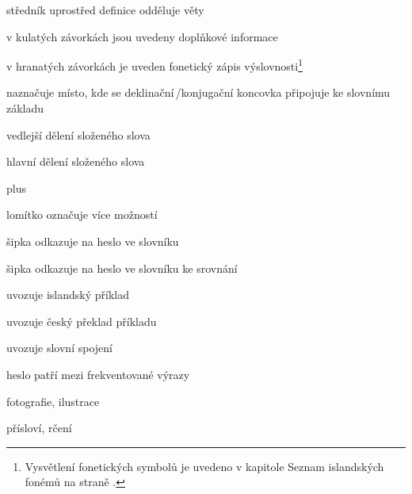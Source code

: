 \item[{;}] {středník uprostřed definice odděluje věty}

\item[{(...)}] {v kulatých závorkách jsou uvedeny doplňkové informace}
\item[{[...]}] {v hranatých závorkách je uveden fonetický zápis výslovnosti}\footnote{Vysvětlení fonetických symbolů je uvedeno v kapitole Seznam islandských fonémů na straně \pageref{sec:phon_phonems}.}
\item[{|}] {naznačuje místo, kde se deklinační\,/\addthin konjugační koncovka připojuje ke slovnímu základu}
\item[{·}] {vedlejší dělení složeného slova}
\item[{··}] {hlavní dělení složeného slova}
\item[{+}] {plus}
\item[{/}] {lomítko označuje více možností}
\item[{\dicsymSee}] {šipka odkazuje na heslo ve slovníku}
\item[{\dicsymCompare}] {šipka odkazuje na heslo ve slovníku ke srovnání}
\item[{\dicsymExampleIS}] {uvozuje islandský příklad}
\item[{\dicsymExampleCS}] {uvozuje český překlad příkladu}
\item[{\dicsymIdiom}] {uvozuje slovní spojení}
\item[{\dicsymFrequent}] {heslo patří mezi frekventované výrazy}

\item[{\dicsymPhoto}] {fotografie, ilustrace}
\item[{\dicsymProverb}] {přísloví, rčení}
